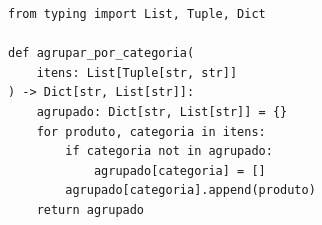 \ifmostrarGabarito
\begin{verbatim}
from typing import List, Tuple, Dict

def agrupar_por_categoria(
    itens: List[Tuple[str, str]]
) -> Dict[str, List[str]]:
    agrupado: Dict[str, List[str]] = {}
    for produto, categoria in itens:
        if categoria not in agrupado:
            agrupado[categoria] = []
        agrupado[categoria].append(produto)
    return agrupado
\end{verbatim}

\fi

